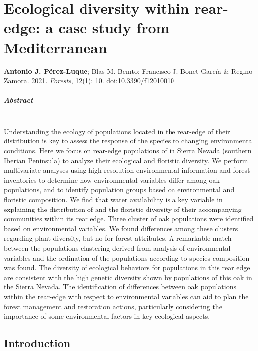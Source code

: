 %
\chapter{Ecological diversity within rear-edge: a case study from Mediterranean \Qpw}\label{sec:multivar}

\mbox{}
\vfill
{\color{ctcolormain}\textbf{Antonio J. Pérez-Luque}}; Blas M. Benito; Francisco J. Bonet-García \& Regino Zamora. 2021. \emph{Forests}, 12(1): 10. \href{https://dx.doi.org/10.3390/f12010010}{doi:10.3390/f12010010}

\newpage

\paragraph{Abstract} \mbox{} \\
Understanding the ecology of populations located in the rear-edge of their distribution is key to assess the response of the species to changing environmental conditions. Here we focus on rear-edge populations of \Qpy in Sierra Nevada (southern Iberian Peninsula) to analyze their ecological and floristic diversity. We perform multivariate analyses using high-resolution environmental information and forest inventories to determine how environmental variables differ among oak populations, and to identify population groups based on environmental and floristic composition.
We find that water availability is a key variable in explaining the distribution of \Qp and the floristic diversity of their accompanying communities within its rear edge. Three cluster of oak populations were identified based on environmental variables. We found differences among these clusters regarding plant diversity, but no for forest attributes. A remarkable match between the populations clustering derived from analysis of environmental variables and the ordination of the populations according to species composition was found.
The diversity of ecological behaviors for \Qp populations in this rear edge are consistent with the high genetic diversity shown by populations of this oak in the Sierra Nevada. The identification of differences between oak populations within the rear-edge with respect to environmental variables can aid to plan the forest management and restoration actions, particularly considering the importance of some environmental factors in key ecological aspects.
\newpage

\section{Introduction}\label{sec:multivar:intro}


